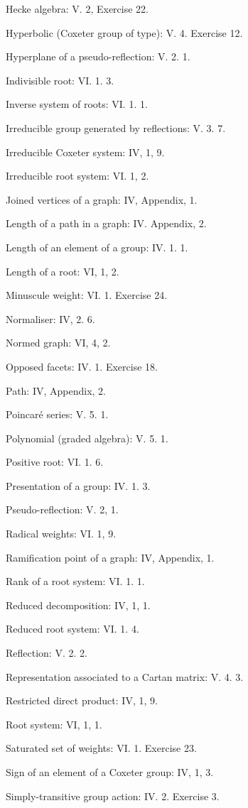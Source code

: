Hecke algebra: V. 2, Exercise 22.

Hyperbolic (Coxeter group of type): V. 4. Exercise 12.

Hyperplane of a pseudo-reflection: V. 2. 1.

Indivisible root: VI. 1. 3.

Inverse system of roots: VI. 1. 1.

Irreducible group generated by reflections: V. 3. 7.

Irreducible Coxeter system: IV, 1, 9.

Irreducible root system: VI. 1, 2.

Joined vertices of a graph: IV, Appendix, 1.

Length of a path in a graph: IV. Appendix, 2.

Length of an element of a group: IV. 1. 1.

Length of a root: VI, 1, 2.

Minuscule weight: VI. 1. Exercise 24.

Normaliser: IV, 2. 6.

Normed graph: VI, 4, 2.

Opposed facets: IV. 1. Exercise 18.

Path: IV, Appendix, 2.

Poincaré series: V. 5. 1.

Polynomial (graded algebra): V. 5. 1.

Positive root: VI. 1. 6.

Presentation of a group: IV. 1. 3.

Pseudo-reflection: V. 2, 1.

Radical weights: VI. 1, 9.

Ramification point of a graph: IV, Appendix, 1.

Rank of a root system: VI. 1. 1.

Reduced decomposition: IV, 1, 1.

Reduced root system: VI. 1. 4.

Reflection: V. 2. 2.

Representation associated to a Cartan matrix: V. 4. 3.

Restricted direct product: IV, 1, 9.

Root system: VI, 1, 1.

Saturated set of weights: VI. 1. Exercise 23.

Sign of an element of a Coxeter group: IV, 1, 3.

Simply-transitive group action: IV. 2. Exercise 3.

